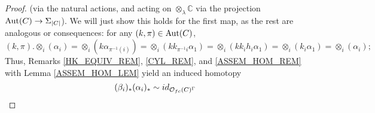\documentclass[a4paper,10pt
,draft
]{article}%
\renewcommand{\1}{\eta}%
\begin{document}
\begin{proof}
      (via the natural actions, and acting on $\otimes_\lambda \mathbb C$ via the projection $\operatorname{Aut}(C) \to \Sigma_{|C|}$).
      We will just show this holds for the first map, as the rest are analogous or consequences:
      for any $(k,\pi) \in \operatorname{Aut}(C)$,
      \begin{equation}
            \label{AB_STAR_EQ}
            (k, \pi) . \otimes_i(\alpha_i)
            =
            \otimes_i (k \alpha_{\pi^{-1}(i)})
            =
            \otimes_i (k k_{\pi^{-1}i} \alpha_1)
            =
            \otimes_i (k k_i h_i \alpha_1)
            =
            \otimes_i (k_i \alpha_1)
            =
            \otimes_i (\alpha_i);
      \end{equation}
      Thus, 
      Remarks \ref{HK_EQUIV_REM}, \ref{CYL_REM}, and \ref{ASSEM_HOM_REM} with Lemma \ref{ASSEM_HOM_LEM}
      yield an induced homotopy
      \begin{equation}
            (\beta_i)_{\**}(\alpha_i)_{\**} \sim id_{\O_{f c}(C)^\Gamma}

\end{equation}
\end{proof}
\end{document}
